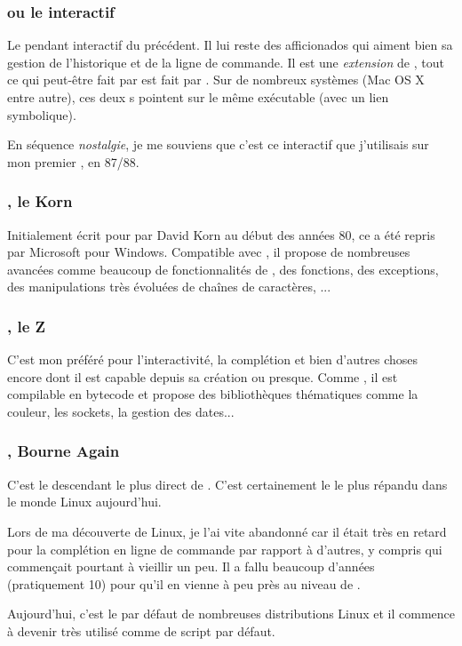\subsubsection{\tcsh{} ou le \csh{} interactif}
Le pendant interactif du précédent. Il lui reste des afficionados qui aiment bien sa gestion de l'historique et de la ligne de commande.  Il est une \emph{extension} de \csh{}, \ie tout ce qui peut-être fait par \csh{} est fait par \tcsh{}. Sur de nombreux systèmes (Mac OS X  entre autre), ces deux \shell{}s pointent sur le même exécutable (avec un lien symbolique).

En séquence \emph{nostalgie}, je me souviens que c'est ce \shell{} interactif que j'utilisais sur mon premier \unix{}, en 87/88.

\subsubsection{\ksh{}, le Korn  \shell{}}
Initialement écrit pour \unix{} par David Korn au début des années 80, ce \shell{} a été repris par Microsoft pour Windows. Compatible avec \sh{}, il propose de nombreuses avancées comme beaucoup de fonctionnalités de \tcsh{},  des fonctions, des exceptions, des manipulations très évoluées de chaînes de caractères, ...

\subsubsection{\zsh{}, le Z  \shell{}}
C'est mon préféré pour l'interactivité, la complétion et bien d'autres choses encore dont il est capable depuis sa création ou presque. Comme \ksh{}, il est compilable en bytecode et propose des bibliothèques thématiques comme la couleur, les sockets, la gestion des dates...

\subsubsection{\bash{}, Bourne Again  \shell{}}
C'est le descendant le plus direct de \sh{}. C'est certainement le \shell{} le plus répandu dans le monde Linux aujourd'hui. 

Lors de ma découverte de Linux, je l'ai vite abandonné car il était très en retard pour la complétion en ligne de commande par rapport à d'autres, y compris \tcsh{} qui commençait pourtant à vieillir un peu. Il a fallu beaucoup d'années (pratiquement 10) pour qu'il en vienne à peu près au niveau de \zsh{}.

Aujourd'hui, c'est le \shell{} par défaut de nombreuses distributions Linux et il commence à devenir très utilisé comme \shell{} de script par défaut. 

